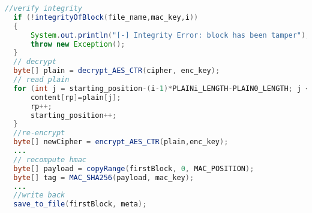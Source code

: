 \documentclass[a4paper,10pt]{article}
\begin{document}
\begin{enumerate}
  \begin{lstlisting}[linewidth=\columnwidth,breaklines=true,language=Java]
  //verify integrity
  if (!integrityOfBlock(file_name,mac_key,i)) 
  {
      System.out.println("[-] Integrity Error: block has been tamper");
      throw new Exception();
  }
  // decrypt
  byte[] plain = decrypt_AES_CTR(cipher, enc_key);
  // read plain
  for (int j = starting_position-(i-1)*PLAINi_LENGTH-PLAIN0_LENGTH; j < numByteToWrite; j++) {                    
      content[rp]=plain[j]; 
      rp++;
      starting_position++;
  }
  //re-encrypt
  byte[] newCipher = encrypt_AES_CTR(plain,enc_key);
  ...
  // recompute hmac
  byte[] payload = copyRange(firstBlock, 0, MAC_POSITION);
  byte[] tag = MAC_SHA256(payload, mac_key);
  ...
  //write back
  save_to_file(firstBlock, meta);\end{lstlisting}
\end{enumerate}
\end{document}
